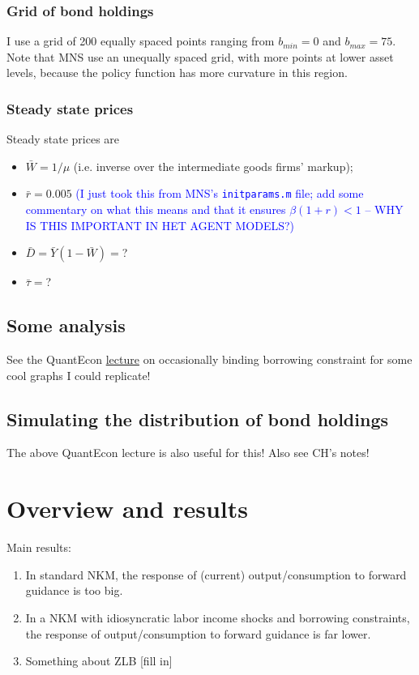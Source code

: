 \documentclass[12pt]{article}
\begin{document}
\subsubsection{Grid of bond holdings}
I use a grid of 200 equally spaced points ranging from $b_{min} = 0$ and $b_{max} = 75$. Note that MNS use an unequally spaced grid, with more points at lower asset levels, because the policy function has more curvature in this region.

\subsubsection{Steady state prices}
Steady state prices are
\begin{itemize}
\item $\bar W = 1/\mu$ (i.e. inverse over the intermediate goods firms' markup);
\item $\bar{r}  = 0.005$ \textcolor{blue}{(I just took this from MNS's \texttt{initparams.m} file; add some commentary on what this means and that it ensures $\beta(1+r) < 1$ -- WHY IS THIS IMPORTANT IN HET AGENT MODELS?)}
\item $\bar{D} = \bar Y(1-\bar W) = $?
\item $\bar{\tau} = $?
\end{itemize}

\subsection{Some analysis}
See the QuantEcon \href{https://lectures.quantecon.org/jl/ifp.html}{lecture} on occasionally binding borrowing constraint for some cool graphs I could replicate!

\subsection{Simulating the distribution of bond holdings}
The above QuantEcon lecture is also useful for this! Also see CH's notes!





\newpage

\section{Overview and results}
Main results:
\begin{enumerate}
\item In standard NKM, the response of (current) output/consumption to forward guidance is too big.
\item In a NKM with idiosyncratic labor income shocks and borrowing constraints, the response of output/consumption to forward guidance is far lower.
\item Something about ZLB [fill in]
\end{enumerate}
\end{document}

